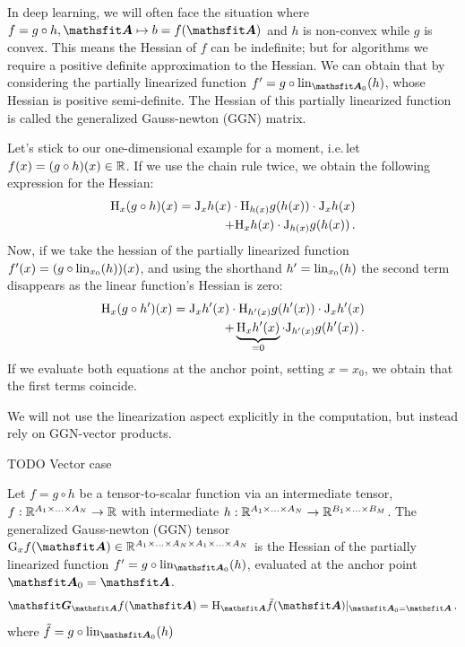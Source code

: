 In deep learning, we will often face the situation where $f = g \circ h, \tA \mapsto b = f(\tA)$ and $h$ is non-convex while $g$ is convex.
This means the Hessian of $f$ can be indefinite; but for algorithms we require a positive definite approximation to the Hessian.
We can obtain that by considering the partially linearized function $f' = g \circ \lin_{\tA_0}(h)$, whose Hessian is positive semi-definite. The Hessian of this partially linearized function is called the generalized Gauss-newton (GGN) matrix.

Let's stick to our one-dimensional example for a moment, i.e.\,let $f(x) = (g \circ h)(x) \in {\mathbb{R}}$. If we use the chain rule twice, we obtain the following expression for the Hessian:
\begin{align*}
  \mathrm{H}_x (g \circ h)(x) =
  \mathrm{J}_x h(x) \cdot \mathrm{H}_{h(x)} g(h(x)) \cdot \mathrm{J}_x h(x)
  \\
  +
  \mathrm{H}_x h(x) \cdot \mathrm{J}_{h(x)} g(h(x))\,.
\end{align*}
Now, if we take the hessian of the partially linearized function $f'(x) = (g \circ \operatorname{lin}_{x_0}(h))(x)$, and using the shorthand $h' = \operatorname{lin}_{x_0}(h)$ the second term disappears as the linear function's Hessian is zero:
\begin{align*}
  \mathrm{H}_x (g \circ h')(x) =
  \mathrm{J}_x h'(x) \cdot \mathrm{H}_{h'(x)} g(h'(x)) \cdot \mathrm{J}_x h'(x)
  \\
  +
  \underbrace{\mathrm{H}_x h'(x)}_{= 0} \cdot \mathrm{J}_{h'(x)} g(h'(x))\,.
\end{align*}
If we evaluate both equations at the anchor point, setting $x = x_0$, we obtain that the first terms coincide.

We will not use the linearization aspect explicitly in the computation, but instead rely on GGN-vector products.

TODO Vector case

\begin{definition}
  Let $f = g \circ h$ be a tensor-to-scalar function via an intermediate tensor, $f: {\mathbb{R}}^{A_1 \times \ldots \times A_N} \to {\mathbb{R}}$ with intermediate $h: {\mathbb{R}}^{A_1 \times \ldots \times A_N} \to {\mathbb{R}}^{B_1 \times \ldots \times B_M}$.
  The generalized Gauss-newton (GGN) tensor $\ggn_x f(\tA) \in \sR^{A_1 \times  \ldots \times A_N \times A_1 \times \ldots \times A_N}$ is the Hessian of the partially linearized function $f' = g \circ \lin_{\tA_0}(h)$, evaluated at the anchor point $\tA_0 = \tA$.
  \begin{align*}
    \tG_{\tA} f(\tA)
    =
    \hess_{\tA} \tilde{f}(\tA)|_{\tA_0 = \tA}\,.
  \end{align*}
  where $\tilde{f} = g \circ \lin_{\tA_0}(h)$
\end{definition}

